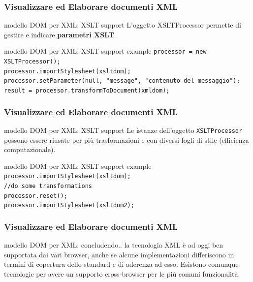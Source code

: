 \begin{frame}
    \frametitle{Visualizzare ed Elaborare documenti XML}
    \addtocounter{nframe}{1}
    

    \begin{block}{modello DOM per XML: XSLT support}
        L'oggetto XSLTProcessor permette di gestire e indicare \textbf{parametri XSLT}.
    \end{block}

    \begin{block}{modello DOM per XML: XSLT support example}
         \texttt{processor = new XSLTProcessor();}
         \\\texttt{processor.importStylesheet(xsltdom);} 
         \\\texttt{processor.setParameter(null, "message", "contenuto del messaggio");} 
         \\\texttt{result = processor.transformToDocument(xmldom);}
    \end{block}
     
\end{frame}

\begin{frame}
    \frametitle{Visualizzare ed Elaborare documenti XML}
    \addtocounter{nframe}{1}
    
    \begin{block}{modello DOM per XML: XSLT support}
        Le istanze dell'oggetto \texttt{XSLTProcessor} possono essere riusate per più trasformazioni e con diversi fogli di stile (efficienza computazionale).
    \end{block}

    \begin{block}{modello DOM per XML: XSLT support example}
        \texttt{processor.importStylesheet(xsltdom); }
        \\\texttt{//do some transformations }
        \\\texttt{processor.reset(); }
        \\\texttt{processor.importStylesheet(xsltdom2); }
    \end{block}
     
\end{frame}

\begin{frame}
    \frametitle{Visualizzare ed Elaborare documenti XML}
    \addtocounter{nframe}{1}

    \begin{block}{modello DOM per XML: concludendo..}
       la tecnologia XML è ad oggi ben supportata dai vari browser, anche se alcune implementazioni differiscono in termini di copertura dello standard e di aderenza ad esso. Esistono comunque tecnologie per avere un supporto cross-browser per le più comuni funzionalità.
    \end{block}
     
\end{frame}



